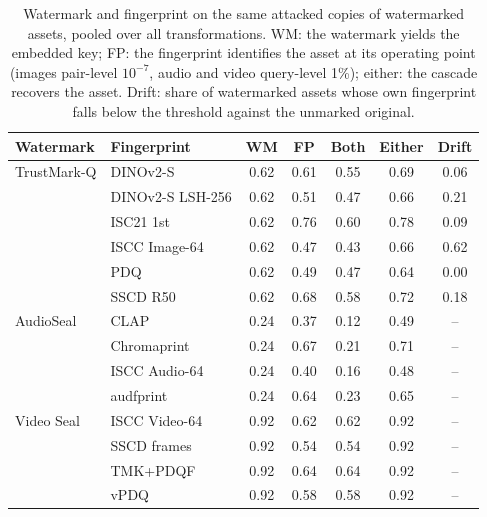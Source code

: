 \begin{table}[!t]
\centering
\footnotesize
\caption{Watermark and fingerprint on the same attacked copies of watermarked assets, pooled over all transformations. WM: the watermark yields the embedded key; FP: the fingerprint identifies the asset at its operating point (images pair-level $10^{-7}$, audio and video query-level 1\%); either: the cascade recovers the asset. Drift: share of watermarked assets whose own fingerprint falls below the threshold against the unmarked original.}
\label{tab:wm}
\setlength{\tabcolsep}{3pt}
\begin{tabular}{llccccc}
\toprule
Watermark & Fingerprint & WM & FP & Both & Either & Drift \\
\midrule
TrustMark-Q & DINOv2-S & 0.62 & 0.61 & 0.55 & 0.69 & 0.06 \\
 & DINOv2-S LSH-256 & 0.62 & 0.51 & 0.47 & 0.66 & 0.21 \\
 & ISC21 1st & 0.62 & 0.76 & 0.60 & 0.78 & 0.09 \\
 & ISCC Image-64 & 0.62 & 0.47 & 0.43 & 0.66 & 0.62 \\
 & PDQ & 0.62 & 0.49 & 0.47 & 0.64 & 0.00 \\
 & SSCD R50 & 0.62 & 0.68 & 0.58 & 0.72 & 0.18 \\
\addlinespace
AudioSeal & CLAP & 0.24 & 0.37 & 0.12 & 0.49 & -- \\
 & Chromaprint & 0.24 & 0.67 & 0.21 & 0.71 & -- \\
 & ISCC Audio-64 & 0.24 & 0.40 & 0.16 & 0.48 & -- \\
 & audfprint & 0.24 & 0.64 & 0.23 & 0.65 & -- \\
\addlinespace
Video Seal & ISCC Video-64 & 0.92 & 0.62 & 0.62 & 0.92 & -- \\
 & SSCD frames & 0.92 & 0.54 & 0.54 & 0.92 & -- \\
 & TMK+PDQF & 0.92 & 0.64 & 0.64 & 0.92 & -- \\
 & vPDQ & 0.92 & 0.58 & 0.58 & 0.92 & -- \\
\bottomrule
\end{tabular}

\end{table}

